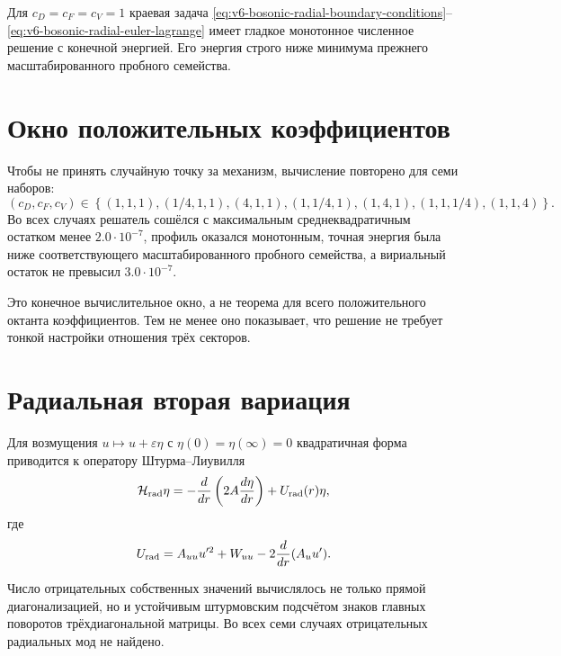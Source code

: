 \begin{theorem}
Для $c_D=c_F=c_V=1$ краевая задача
\eqref{eq:v6-bosonic-radial-boundary-conditions}--
\eqref{eq:v6-bosonic-radial-euler-lagrange} имеет гладкое монотонное
численное решение с конечной энергией. Его энергия строго ниже минимума
прежнего масштабированного пробного семейства.
\end{theorem}

\section{Окно положительных коэффициентов}

Чтобы не принять случайную точку за механизм, вычисление повторено для
семи наборов:
\begin{equation}
 (c_D,c_F,c_V)\in
 \left\{
 (1,1,1),
 (1/4,1,1),(4,1,1),
 (1,1/4,1),(1,4,1),
 (1,1,1/4),(1,1,4)
 \right\}.
\end{equation}
Во всех случаях решатель сошёлся с максимальным среднеквадратичным
остатком менее $2.0\cdot10^{-7}$, профиль оказался монотонным, точная
энергия была ниже соответствующего масштабированного пробного семейства,
а вириальный остаток не превысил $3.0\cdot10^{-7}$.

Это конечное вычислительное окно, а не теорема для всего положительного
октанта коэффициентов. Тем не менее оно показывает, что решение не требует
тонкой настройки отношения трёх секторов.

\section{Радиальная вторая вариация}

Для возмущения $u\mapsto u+\varepsilon\eta$ с
$\eta(0)=\eta(\infty)=0$ квадратичная форма приводится к оператору
Штурма--Лиувилля
\begin{equation}
 \mathcal H_{\rm rad}\eta
 =-\frac{d}{dr}\left(2A\frac{d\eta}{dr}\right)
 +U_{\rm rad}(r)\eta,
 \label{eq:v6-bosonic-radial-hessian}
\end{equation}
где
\begin{equation}
 U_{\rm rad}
 =A_{uu}u'^2+W_{uu}
 -2\frac{d}{dr}(A_u u').
\end{equation}

Число отрицательных собственных значений вычислялось не только прямой
диагонализацией, но и устойчивым штурмовским подсчётом знаков главных
поворотов трёхдиагональной матрицы. Во всех семи случаях отрицательных
радиальных мод не найдено.

